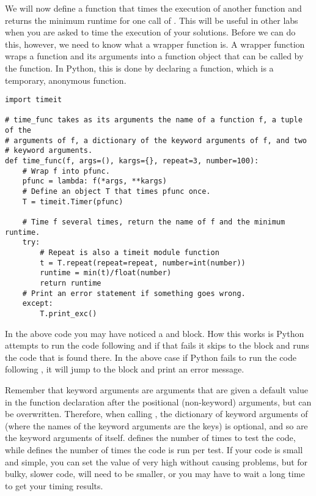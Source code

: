 We will now define a function that times the execution of another function  and returns the minimum runtime for one call of . This will be useful in other labs when you are asked to time the execution of your solutions. Before we can do this, however, we need to know what a wrapper function is. A wrapper function wraps a function and its arguments into a function object that can be called by the  function. In Python, this is done by declaring a  function, which is a temporary, anonymous function.

\begin{lstlisting}
import timeit

# time_func takes as its arguments the name of a function f, a tuple of the
# arguments of f, a dictionary of the keyword arguments of f, and two 
# keyword arguments.
def time_func(f, args=(), kargs={}, repeat=3, number=100):
	# Wrap f into pfunc.
	pfunc = lambda: f(*args, **kargs)
	# Define an object T that times pfunc once.
	T = timeit.Timer(pfunc)

	# Time f several times, return the name of f and the minimum runtime.
	try:
		# Repeat is also a timeit module function
		t = T.repeat(repeat=repeat, number=int(number))
		runtime = min(t)/float(number)
		return runtime
	# Print an error statement if something goes wrong.
	except:
		T.print_exc()
\end{lstlisting}

In the above code you may have noticed a  and  block. How this works is Python attempts to run the code following  and if that fails it skips to the  block and runs the code that is found there. In the above case if Python fails to run the code following , it will jump to the  block and print an error message.

Remember that keyword arguments are arguments that are given a default value in the function declaration after the positional (non-keyword) arguments, but can be overwritten. Therefore, when calling , the dictionary of keyword arguments of  (where the names of the keyword arguments are the keys) is optional, and so are the keyword arguments of  itself.
 defines the number of times to test the code, while  defines the number of times the code is run per test. If your code is small and simple, you can set the value of  very high without causing problems, but for bulky, slower code,  will need to be smaller, or you may have to wait a long time to get your timing results.


